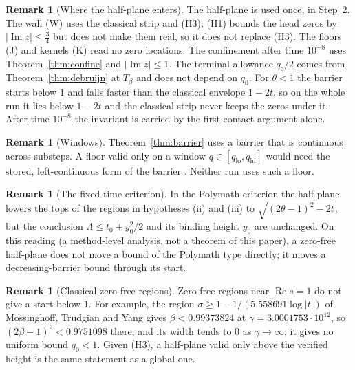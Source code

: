 \documentclass[11pt]{article}
\theoremstyle{definition}
\newtheorem{remark}[theorem]{Remark}
\newcommand{\LB}{\Lambda}
\newcommand{\qe}{q_{\mathrm e}}
\DeclareMathOperator{\Rea}{Re}
\DeclareMathOperator{\Ima}{Im}
\begin{document}
\begin{remark}[Where the half-plane enters]\label{rem:where}
The half-plane is used once, in Step~2. The wall (W) uses the classical strip and (H3);
(H1) bounds the head zeros by $|\Ima z|\le\frac34$ but does not make them real, so it does
not replace (H3). The floors (J) and kernels (K) read no zero locations. The confinement
after time $10^{-8}$ uses Theorem~\ref{thm:confine} and $|\Ima z|\le1$. The terminal
allowance $\qe/2$ comes from Theorem~\ref{thm:debruijn} at $T_\beta$ and does not depend on
$q_0$. For $\theta<1$ the barrier starts below $1$ and falls faster than the classical
envelope $1-2t$, so on the whole run it lies below $1-2t$ and the classical strip never
keeps the zeros under it. After time $10^{-8}$ the invariant is carried by the
first-contact argument alone.
\end{remark}

\begin{remark}[Windows]
Theorem~\ref{thm:barrier} uses a barrier that is continuous across substeps. A floor valid
only on a window $q\in[q_{\mathrm{lo}},q_{\mathrm{hi}}]$ would need the stored, left-continuous
form of the barrier \cite[\S\S4.2, 8]{IntReviewB}. Neither run uses such a floor.
\end{remark}

\begin{remark}[The fixed-time criterion]
In the Polymath criterion \cite[Theorem~1.2]{Polymath19} the half-plane lowers the tops of
the regions in hypotheses (ii) and (iii) to $\sqrt{(2\theta-1)^2-2t}$, but the conclusion
$\LB\le t_0+y_0^2/2$ and its binding height $y_0$ are unchanged. On this reading
(a method-level analysis, not a theorem of this paper), a zero-free half-plane does not move
a bound of the Polymath type directly; it moves a decreasing-barrier bound through its start.
\end{remark}

\begin{remark}[Classical zero-free regions]
Zero-free regions near $\Rea s=1$ do not give a start below $1$. For example, the region
$\sigma\ge1-1/(5.558691\log|t|)$ of Mossinghoff, Trudgian and Yang \cite{MTY24} gives
$\beta<0.99373824$ at $\gamma=3.0001753\cdot10^{12}$, so $(2\beta-1)^2<0.9751098$ there, and
its width tends to $0$ as $\gamma\to\infty$; it gives no uniform bound $q_0<1$. Given (H3),
a half-plane valid only above the verified height is the same statement as a global one.
\end{remark}
\end{document}

